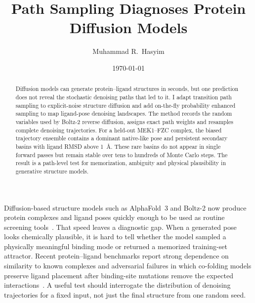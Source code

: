\documentclass[aps,prl,twocolumn,superscriptaddress,floatfix]{revtex4-2}
\begin{document}
\linenumbers

\title{Path Sampling Diagnoses Protein Diffusion Models}

\author{Muhammad R.~Hasyim}

\date{\today}

\begin{abstract}
Diffusion models can generate protein--ligand structures in seconds, but one
prediction does not reveal the stochastic denoising paths that led to it. I
adapt transition path sampling to explicit-noise structure diffusion and add
on-the-fly probability enhanced sampling to map ligand-pose denoising
landscapes. The method records the random variables used by Boltz-2 reverse
diffusion, assigns exact path weights and resamples complete denoising
trajectories. For a held-out MEK1--FZC complex, the biased trajectory ensemble
contains a dominant native-like pose and persistent secondary basins with
ligand RMSD above 1~\AA. These rare basins do not appear in single forward
passes but remain stable over tens to hundreds of Monte Carlo steps. The
result is a path-level test for memorization, ambiguity and physical
plausibility in generative structure models.
\end{abstract}

\maketitle

Diffusion-based structure models such as AlphaFold~3 and Boltz-2 now produce
protein complexes and ligand poses quickly enough to be used as routine
screening tools~\cite{alphafold3,boltz2}. That speed leaves a diagnostic gap.
When a generated pose looks chemically plausible, it is hard to tell whether
the model sampled a physically meaningful binding mode or returned a memorized
training-set attractor. Recent protein--ligand benchmarks report strong
dependence on similarity to known complexes and adversarial failures in which
co-folding models preserve ligand placement after binding-site mutations
remove the expected interactions~\cite{masters2024,skrinjar2025}. A useful
test should interrogate the distribution of denoising trajectories for a fixed
input, not just the final structure from one random seed.
\end{document}
